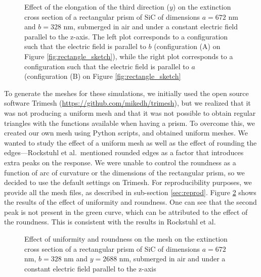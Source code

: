 \begin{figure}
    \centering
    \caption{Effect of the elongation of the third direction ($y$) on the 
        extinction cross section of a rectangular prism of SiC of dimensions $a=672$ nm 
        and $b=328$ nm, submerged in air and under a constant electric field 
        parallel to the z-axis. The left plot corresponds to a configuration such that the electric 
        field is parallel to $b$ (configuration (A) on Figure \ref{fig:rectangle_sketch}), while the 
        right plot corresponds to a configuration such that the electric field is 
        parallel to $a$ (configuration (B) on Figure \ref{fig:rectangle_sketch}}
    \label{fig:ext_y_14}   
 \end{figure}


To generate the meshes for these simulations, we initially used the open source software Trimesh 
(\url{https://github.com/mikedh/trimesh}), but we realized that it was not producing a 
uniform mesh and that it was not possible to obtain regular triangles with the functions 
available when having a prism. To overcome this, we created our own mesh using Python scripts,
and obtained uniform meshes. We wanted to study the effect of a uniform mesh as well as the effect
of rounding the edges---Rockstuhl et al.\ mentioned rounded edges
as a factor that introduces extra peaks on the response. We were unable to control the 
roundness as a function of arc of curvature or the dimensions of the rectangular prism, so we 
decided to use the default settings on Trimesh. 
For reproducibility purposes, we provide all the mesh files, as described in sub-section \ref{sec:reprod}.
Figure \ref{fig:tri_reg_round_14} shows the 
results of the effect of uniformity and roundness. One can see that the second peak is not
present in the green curve, which can be attributed to the effect of the roundness. This is 
consistent with the results in Rockstuhl et al. 

\begin{figure}
    \centering
    \caption{ Effect of uniformity and roundness on the mesh on the 
    extinction cross section of a rectangular prism of SiC of dimensions $a=672$ nm, 
    $b=328$ nm and $y=2688$ nm, submerged in air and under a constant electric field 
    parallel to the z-axis}
    \label{fig:tri_reg_round_14}
 \end{figure}

